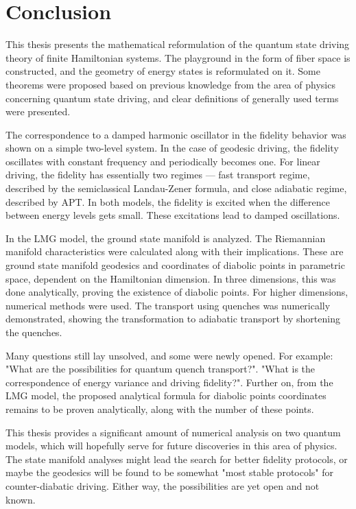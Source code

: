 \chapter*{Conclusion}
This thesis presents the mathematical reformulation of the quantum state driving theory of finite Hamiltonian systems. The playground in the form of fiber space is constructed, and the geometry of energy states is reformulated on it. Some theorems were proposed based on previous knowledge from the area of physics concerning quantum state driving, and clear definitions of generally used terms were presented.

The correspondence to a damped harmonic oscillator in the fidelity behavior was shown on a simple two-level system. In the case of geodesic driving, the fidelity oscillates with constant frequency and periodically becomes one. For linear driving, the fidelity has essentially two regimes — fast transport regime, described by the semiclassical Landau-Zener formula, and close adiabatic regime, described by APT. In both models, the fidelity is excited when the difference between energy levels gets small. These excitations lead to damped oscillations.

In the LMG model, the ground state manifold is analyzed. The Riemannian manifold characteristics were calculated along with their implications. These are ground state manifold geodesics and coordinates of diabolic points in parametric space, dependent on the Hamiltonian dimension. In three dimensions, this was done analytically, proving the existence of diabolic points. For higher dimensions, numerical methods were used. The transport using quenches was numerically demonstrated, showing the transformation to adiabatic transport by shortening the quenches.

Many questions still lay unsolved, and some were newly opened. For example: "What are the possibilities for quantum quench transport?". "What is the correspondence of energy variance and driving fidelity?". Further on, from the LMG model, the proposed analytical formula for diabolic points coordinates remains to be proven analytically, along with the number of these points.

This thesis provides a significant amount of numerical analysis on two quantum models, which will hopefully serve for future discoveries in this area of physics. The state manifold analyses might lead the search for better fidelity protocols, or maybe the geodesics will be found to be somewhat "most stable protocols" for counter-diabatic driving. Either way, the possibilities are yet open and not known.